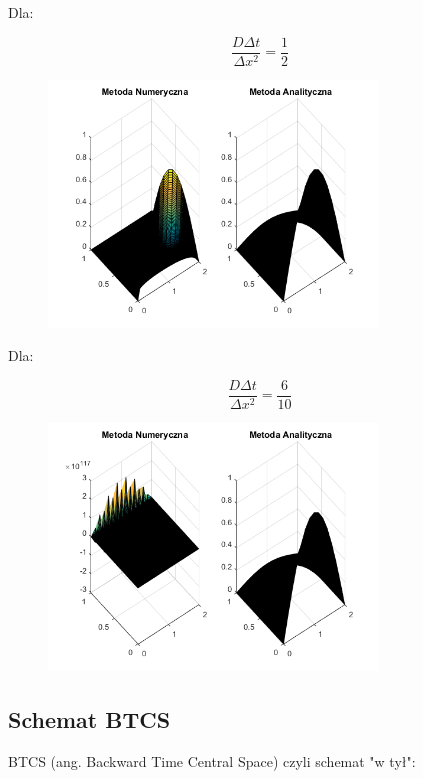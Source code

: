 Dla:

$$\dfrac{D\Delta t}{\Delta x^2} = \dfrac{1}{2}$$

\begin{figure}[!ht]
	\begin{center}
		\includegraphics[width=0.78\textwidth]{Lab7/charts/ftcs/oscylowanko05.png}
	\end{center}
\end{figure}

\newpage

Dla:

$$\dfrac{D\Delta t}{\Delta x^2} = \dfrac{6}{10}$$

\begin{figure}[!ht]
	\begin{center}
		\includegraphics[width=0.78\textwidth]{Lab7/charts/ftcs/oscylowanko06.png}
	\end{center}
\end{figure}

\subsection{Schemat BTCS}
BTCS (ang. Backward Time Central Space) czyli schemat "w tył":

